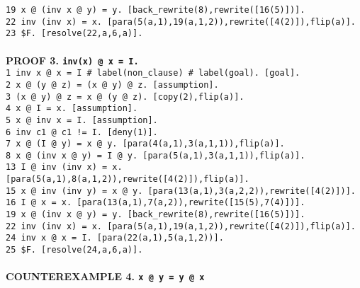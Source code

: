 \documentclass[a4paper]{article}
\begin{document}
{	{\tt 19 x @ (inv x @ y) = y.  [back\_rewrite(8),rewrite([16(5)])].}\\
	{\tt 22 inv (inv x) = x.  [para(5(a,1),19(a,1,2)),rewrite([4(2)]),flip(a)].}\\
	{\tt 23 \$F.  [resolve(22,a,6,a)].}\\
	\\
	\textbf{PROOF 3. {\tt  inv(x) @ x = I.}}\\      
	{\tt 1 inv x @ x = I \# label(non\_clause) \# label(goal).  [goal].}\\
	{\tt 2 x @ (y @ z) = (x @ y) @ z.  [assumption].}\\
	{\tt 3 (x @ y) @ z = x @ (y @ z).  [copy(2),flip(a)].}\\
	{\tt 4 x @ I = x.  [assumption].}\\
	{\tt 5 x @ inv x = I.  [assumption].}\\
	{\tt 6 inv c1 @ c1 != I.  [deny(1)].}\\
	{\tt 7 x @ (I @ y) = x @ y.  [para(4(a,1),3(a,1,1)),flip(a)].}\\
	{\tt 8 x @ (inv x @ y) = I @ y.  [para(5(a,1),3(a,1,1)),flip(a)].}\\
	{\tt 13 I @ inv (inv x) = x.  [para(5(a,1),8(a,1,2)),rewrite([4(2)]),flip(a)].}\\
	{\tt 15 x @ inv (inv y) = x @ y.  [para(13(a,1),3(a,2,2)),rewrite([4(2)])].}\\
	{\tt 16 I @ x = x.  [para(13(a,1),7(a,2)),rewrite([15(5),7(4)])].}\\
	{\tt 19 x @ (inv x @ y) = y.  [back\_rewrite(8),rewrite([16(5)])].}\\
	{\tt 22 inv (inv x) = x.  [para(5(a,1),19(a,1,2)),rewrite([4(2)]),flip(a)].}\\
	{\tt 24 inv x @ x = I.  [para(22(a,1),5(a,1,2))].}\\
	{\tt 25 \$F.  [resolve(24,a,6,a)].}\\
	\\
	\textbf{COUNTEREXAMPLE 4. {\tt  x @ y = y @ x}}\\
}
\end{document}
